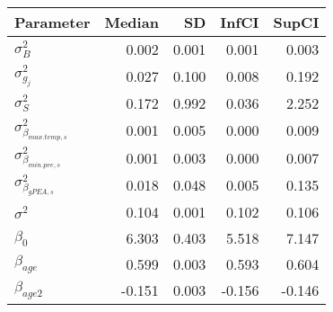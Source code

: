 \begin{table}[ht]
\centering
\begin{tabular}{lrrrr}
  \hline
Parameter & Median & SD & InfCI & SupCI \\ 
  \hline
$\sigma^{2}_{B}$ & 0.002 & 0.001 & 0.001 & 0.003 \\ 
  $\sigma^{2}_{g_{j}}$ & 0.027 & 0.100 & 0.008 & 0.192 \\ 
  $\sigma^{2}_{S}$ & 0.172 & 0.992 & 0.036 & 2.252 \\ 
  $\sigma^{2}_{\beta_{max.temp,s}}$ & 0.001 & 0.005 & 0.000 & 0.009 \\ 
  $\sigma^{2}_{\beta_{min.pre,s}}$ & 0.001 & 0.003 & 0.000 & 0.007 \\ 
  $\sigma^{2}_{\beta_{gPEA,s}}$ & 0.018 & 0.048 & 0.005 & 0.135 \\ 
  $\sigma^{2}$ & 0.104 & 0.001 & 0.102 & 0.106 \\ 
  $\beta_{0}$ & 6.303 & 0.403 & 5.518 & 7.147 \\ 
  $\beta_{age}$ & 0.599 & 0.003 & 0.593 & 0.604 \\ 
  $\beta_{age2}$ & -0.151 & 0.003 & -0.156 & -0.146 \\ 
   \hline
\end{tabular}
\end{table}

